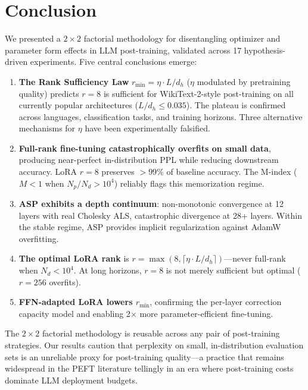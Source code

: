 \documentclass[11pt]{article}
\begin{document}
\section{Conclusion}

We presented a $2\times2$ factorial methodology for disentangling optimizer and parameter form effects in LLM post-training, validated across 17 hypothesis-driven experiments. Five central conclusions emerge:

\begin{enumerate}[leftmargin=*]
\item \textbf{The Rank Sufficiency Law} $r_{\min} = \eta \cdot L/d_h$ ($\eta$ modulated by pretraining quality) predicts $r=8$ is sufficient for WikiText-2-style post-training on all currently popular architectures ($L/d_h \leq 0.035$). The plateau is confirmed across languages, classification tasks, and training horizons. Three alternative mechanisms for $\eta$ have been experimentally falsified.

\item \textbf{Full-rank fine-tuning catastrophically overfits on small data}, producing near-perfect in-distribution PPL while reducing downstream accuracy. LoRA $r=8$ preserves $>99\%$ of baseline accuracy. The M-index ($M < 1$ when $N_p/N_d > 10^4$) reliably flags this memorization regime.

\item \textbf{ASP exhibits a depth continuum}: non-monotonic convergence at 12 layers with real Cholesky ALS, catastrophic divergence at 28+ layers. Within the stable regime, ASP provides implicit regularization against AdamW overfitting.

\item \textbf{The optimal LoRA rank} is $r = \max(8, \lceil \eta \cdot L/d_h \rceil)$---never full-rank when $N_d < 10^4$. At long horizons, $r=8$ is not merely sufficient but optimal ($r=256$ overfits).

\item \textbf{FFN-adapted LoRA lowers $r_{\min}$}, confirming the per-layer correction capacity model and enabling 2$\times$ more parameter-efficient fine-tuning.
\end{enumerate}

The $2\times2$ factorial methodology is reusable across any pair of post-training strategies. Our results caution that perplexity on small, in-distribution evaluation sets is an unreliable proxy for post-training quality---a practice that remains widespread in the PEFT literature tellingly in an era where post-training costs dominate LLM deployment budgets.
\end{document}
